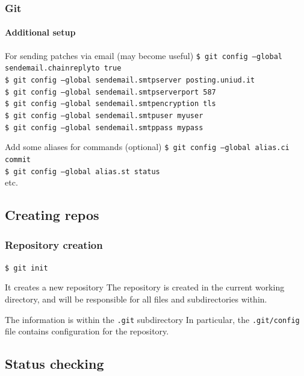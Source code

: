 \begin{frame}
\frametitle{Git}
\framesubtitle{Additional setup}

\begin{block}{For sending patches via email (may become useful)}
\texttt{\$ git config ---global sendemail.chainreplyto true} \\
\texttt{\$ git config ---global sendemail.smtpserver posting.uniud.it} \\
\texttt{\$ git config ---global sendemail.smtpserverport 587} \\
\texttt{\$ git config ---global sendemail.smtpencryption tls} \\
\texttt{\$ git config ---global sendemail.smtpuser myuser} \\
\texttt{\$ git config ---global sendemail.smtppass mypass}
\end{block}

\pause
\begin{block}{Add some aliases for commands (optional)}
\texttt{\$ git config ---global alias.ci commit} \\
\texttt{\$ git config ---global alias.st status} \\
etc.
\end{block}
\end{frame}

\subsection{Creating repos}

\begin{frame}
\frametitle{Repository creation}

\texttt{\$ git init}

\bigskip
\begin{block}{It creates a new repository}
The repository is created in the current working directory, and will be responsible for all files and subdirectories within.
\end{block}
\begin{block}{The information is within the \texttt{.git} subdirectory}
In particular, the \texttt{.git/config} file contains configuration for the repository.
\end{block}
\end{frame}

\subsection{Status checking}

